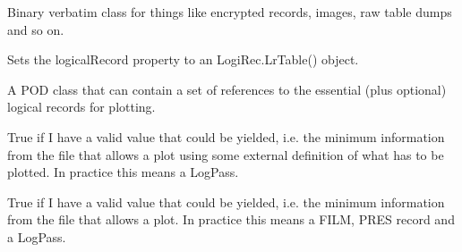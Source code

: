 \documentclass[letterpaper,10pt,english]{sphinxmanual}
\begin{document}
\begin{fulllineitems}
\label{\detokenize{ref/LIS/core/FileIndexer:TotalDepth.LIS.core.FileIndexer.IndexUnknownInternalFormat}}
Binary verbatim class for things like encrypted records, images, raw table dumps and so on.

\begin{fulllineitems}
\label{\detokenize{ref/LIS/core/FileIndexer:TotalDepth.LIS.core.FileIndexer.IndexUnknownInternalFormat.setLogicalRecord}}
Sets the logicalRecord property to an LogiRec.LrTable() object.

\end{fulllineitems}


\end{fulllineitems}


\begin{fulllineitems}
\label{\detokenize{ref/LIS/core/FileIndexer:TotalDepth.LIS.core.FileIndexer.PlotRecordSet}}
A POD class that can contain a set of references to the essential (plus
optional) logical records for plotting.

\begin{fulllineitems}
\label{\detokenize{ref/LIS/core/FileIndexer:TotalDepth.LIS.core.FileIndexer.PlotRecordSet.canPlotFromExternalRecords}}
True if I have a valid value that could be yielded, i.e. the minimum
information from the file that allows a plot using some external definition
of what has to be plotted. In practice this means a LogPass.

\end{fulllineitems}


\begin{fulllineitems}
\label{\detokenize{ref/LIS/core/FileIndexer:TotalDepth.LIS.core.FileIndexer.PlotRecordSet.canPlotFromInternalRecords}}
True if I have a valid value that could be yielded, i.e. the minimum
information from the file that allows a plot. In practice this means a
FILM, PRES record and a LogPass.

\end{fulllineitems}


\end{fulllineitems}
\end{document}
